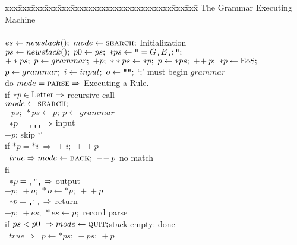 



\begin{tabbing}
xxx\=xxx\=xxx\=xxx\=xxx\=xxxxxxxxxxxxxxxxxxxxxxx\=xxx\=xxx\=\kill
\bq The Grammar Executing Machine \\
\\
$es\leftarrow newstack();\ mode\leftarrow\tname{search};$\>\>\>\>\>\>
						\bq Initialization	\\
$ps\leftarrow newstack();\ p0\leftarrow ps;\ *ps\leftarrow\qt=G\sq E\sq;\qt;$			\\
$+*ps;\ p\leftarrow grammar;\ +p;\ **ps\leftarrow*p;\ p\leftarrow*ps;\ +\!+p;\ *p\leftarrow{\rm EoS};$\\
$p\leftarrow grammar;\ i\leftarrow input;\ o\leftarrow\qt\qt;$
	\>\>\>\>\>\>\bq `;' must begin $grammar$			\\
  do $mode=\mbox{\sc {parse}}\Rightarrow$ \>\>\>\>\>\>
						\bq Executing a Rule.	\\
\>	if $*p\in{\rm Letter}\Rightarrow$\>\>\>\>\>
						\bq recursive call	\\
\>\>	    $mode\leftarrow\mbox{\sc {search}};$					\\
\>\>	    $+ps;\ *ps\leftarrow p;\ p\leftarrow grammar$\>\>\>\>		\\
\>	\orbox\ $*p=\sq\sq\sq \Rightarrow$ \>\>\>\>
					\>	\bq input		\\
\>\>	    $+p$;			\>\>\>\>\>\bq skip `\sq'	\\
\>\>	    if $*p=*i\ \Rightarrow\ +i;\ +\!+p$
					\>\>\>\>\>\bq {\em shift}	\\
\>\>	    \orbox\ $true \Rightarrow mode\leftarrow\mbox{\sc {back}};\ -\!-p$	
					\>\>\>\>\>\bq no match		\\
\>\>	    f{}i							\\
\>	\orbox\ $*p=\sq\qt\sq \Rightarrow$ \>\>\>\>	\>
						\bq output		\\
\>\>	    $+p;\ +o;\ *o\leftarrow*p;\ +\!+p$					\\
\>	\orbox\ $*p=\sq;\sq \Rightarrow$\>\>\>\>\>
						\bq return		\\
\>\>	    $-p;\ +es;\ *es\leftarrow p;$	\>\>\>\>\>\bq record parse	\\
\>\>	    if $ps<p0\ \Rightarrow mode\leftarrow\mbox{\sc {quit}};$\>\>\>\>\>\bq stack empty: done	\\
\>\>	    \orbox\ $true \Rightarrow$\ $p\leftarrow*ps;\ -ps;\ +p$\>\>\>\>\>	\\

\end{tabbing}
